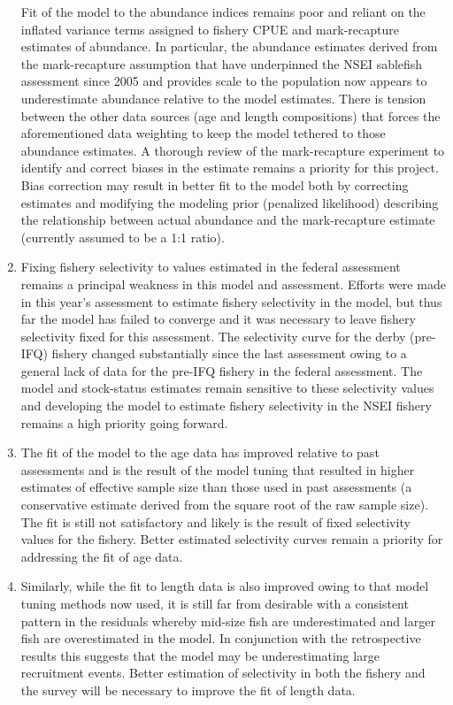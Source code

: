 \documentclass[
]{article}
\begin{document}
\begin{enumerate}
  Fit of the model to the abundance indices remains poor and reliant on the inflated variance terms assigned to fishery CPUE and mark-recapture estimates of abundance. In particular, the abundance estimates derived from the mark-recapture assumption that have underpinned the NSEI sablefish assessment since 2005 and provides scale to the population now appears to underestimate abundance relative to the model estimates. There is tension between the other data sources (age and length compositions) that forces the aforementioned data weighting to keep the model tethered to those abundance estimates. A thorough review of the mark-recapture experiment to identify and correct biases in the estimate remains a priority for this project. Bias correction may result in better fit to the model both by correcting estimates and modifying the modeling prior (penalized likelihood) describing the relationship between actual abundance and the mark-recapture estimate (currently assumed to be a 1:1 ratio).\\
\item
  Fixing fishery selectivity to values estimated in the federal assessment remains a principal weakness in this model and assessment. Efforts were made in this year's assessment to estimate fishery selectivity in the model, but thus far the model has failed to converge and it was necessary to leave fishery selectivity fixed for this assessment. The selectivity curve for the derby (pre-IFQ) fishery changed substantially since the last assessment owing to a general lack of data for the pre-IFQ fishery in the federal assessment. The model and stock-status estimates remain sensitive to these selectivity values and developing the model to estimate fishery selectivity in the NSEI fishery remains a high priority going forward.
\item
  The fit of the model to the age data has improved relative to past assessments and is the result of the model tuning that resulted in higher estimates of effective sample size than those used in past assessments (a conservative estimate derived from the square root of the raw sample size). The fit is still not satisfactory and likely is the result of fixed selectivity values for the fishery. Better estimated selectivity curves remain a priority for addressing the fit of age data.
\item
  Similarly, while the fit to length data is also improved owing to that model tuning methods now used, it is still far from desirable with a consistent pattern in the residuals whereby mid-size fish are underestimated and larger fish are overestimated in the model. In conjunction with the retrospective results this suggests that the model may be underestimating large recruitment events. Better estimation of selectivity in both the fishery and the survey will be necessary to improve the fit of length data.

\end{enumerate}
\end{document}
